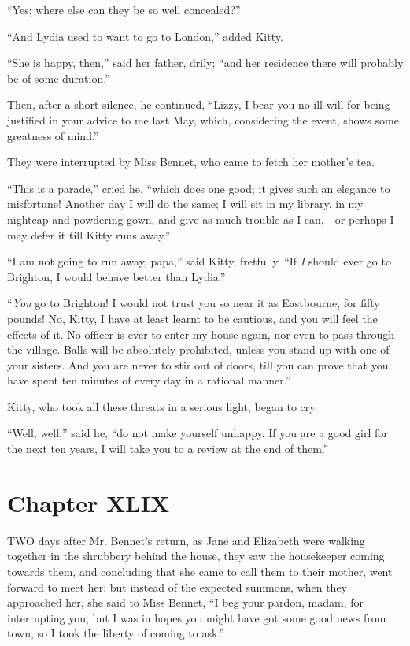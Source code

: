 \documentclass[12pt,openright]{book}
\begin{document}
“Yes; where else can they be so well concealed?”

“And Lydia used to want to go to London,” added Kitty.

“She is happy, then,” said her father, drily; “and her residence there will probably be of some duration.”

Then, after a short silence, he continued, “Lizzy, I bear you no ill-will for being justified in your advice to me last May, which, considering the event, shows some greatness of mind.”

They were interrupted by Miss Bennet, who came to fetch her mother’s tea.

“This is a parade,” cried he, “which does one good; it gives such an elegance to misfortune! Another day I will do the same; I will sit in my library, in my nightcap and powdering gown, and give as much trouble as I can,—or perhaps I may defer it till Kitty runs away.”

“I am not going to run away, papa,” said Kitty, fretfully. “If \textit{I} should ever go to Brighton, I would behave better than Lydia.”

“\textit{You} go to Brighton! I would not trust you so near it as Eastbourne, for fifty pounds! No, Kitty, I have at least learnt to be cautious, and you will feel the effects of it. No officer is ever to enter my house again, nor even to pass through the village. Balls will be absolutely prohibited, unless you stand up with one of your sisters. And you are never to stir out of doors, till you can prove that you have spent ten minutes of every day in a rational manner.”

Kitty, who took all these threats in a serious light, began to cry.

“Well, well,” said he, “do not make yourself unhappy. If you are a good girl for the next ten years, I will take you to a review at the end of them.”

\chapter{Chapter XLIX}

\noindent  TWO days after Mr. Bennet’s return, as Jane and Elizabeth were walking together in the shrubbery behind the house, they saw the housekeeper coming towards them, and concluding that she came to call them to their mother, went forward to meet her; but instead of the expected summons, when they approached her, she said to Miss Bennet, “I beg your pardon, madam, for interrupting you, but I was in hopes you might have got some good news from town, so I took the liberty of coming to ask.”
\end{document}
